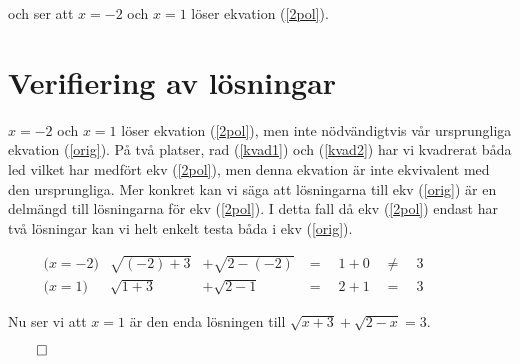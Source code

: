 \documentclass{article}
\begin{document}
och ser att $x = -2$ och $x = 1$ löser ekvation (\ref{2pol}).

\section*{Verifiering av lösningar}

$x = -2$ och $x = 1$ löser ekvation (\ref{2pol}), men inte nödvändigtvis vår ursprungliga ekvation (\ref{orig}). På två platser, rad (\ref{kvad1}) och (\ref{kvad2}) har vi kvadrerat båda led vilket har medfört ekv (\ref{2pol}), men denna ekvation är inte ekvivalent med den ursprungliga. Mer konkret kan vi säga att lösningarna till ekv (\ref{orig}) är en delmängd till lösningarna för ekv (\ref{2pol}). I detta fall då ekv (\ref{2pol}) endast har två lösningar kan vi helt enkelt testa båda i ekv (\ref{orig}).

\begin{align*}
  & \text{($x = -2$)}&  \sqrt{(-2) + 3} &+ \sqrt{2 - (-2)} &= \quad 1 + 0 \quad \neq \quad 3 \quad\quad\quad&&\\
  & \text{($x = 1$)}&  \sqrt{1 + 3}    &+ \sqrt{2 - 1}    &= \quad 2 + 1 \quad =    \quad 3    \quad\quad\quad&&
\end{align*}

Nu ser vi att $x = 1$ är den enda lösningen till $\sqrt{x + 3} + \sqrt{2 - x} = 3$.

\centerline{$\qed$}
\end{document}
